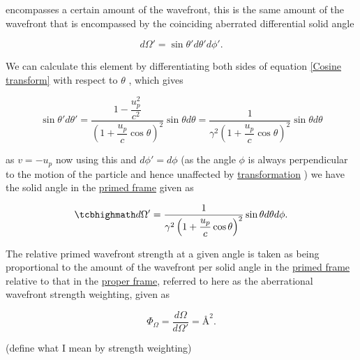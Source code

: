 encompasses a certain amount of the wavefront, this is the same amount of the wavefront that is encompassed by the coinciding aberrated differential solid angle

\begin{equation}
	d\Omega' = \sin{\theta'} d\theta' d\phi'.
\end{equation}

We can calculate this element by differentiating both sides of equation \eqref{Cosine transform} with respect to $\theta$ \cite{hogg1997special}, which gives

\begin{equation}
	\sin{\theta'} d\theta' =   \dfrac{1-\dfrac{u_p^2}{c^2}}{\left(1+\dfrac{u_p}{c}\cos{\theta}\right)^2} \sin{\theta} d\theta =  \dfrac{1}{\gamma^2\left(1+\dfrac{u_p}{c}\cos{\theta}\right)^2} \sin{\theta} d\theta
\end{equation}

as $v=-u_p$ now using this and $d\phi'=d\phi$ (as the angle $\phi$ is always perpendicular to the motion of the particle and hence unaffected by \hyperlink{def-transform}{transformation} ) we have the solid angle in the \hyperlink{def-Primed-Frame}{primed frame} given as

\begin{equation}
	\mhl{
		d\Omega' = \dfrac{1}{\gamma^2\left(1+\dfrac{u_p}{c}\cos{\theta}\right)^2} \sin{\theta} d\theta d\phi.
	}
\end{equation}

The relative primed wavefront strength at a given angle is taken as being proportional to the amount of the wavefront per solid angle in the \hyperlink{def-Primed-Frame}{primed frame} relative to that in the \hyperlink{def-proper-frame}{proper frame}, referred to here as the aberrational wavefront strength weighting, given as

\begin{equation}
	\label{eq: aberrational wavefront weighting}
	\Phi_\Omega = \frac{d\Omega}{d\Omega'} = \text{\AA}^2.
\end{equation}

(define what I mean by strength weighting)

